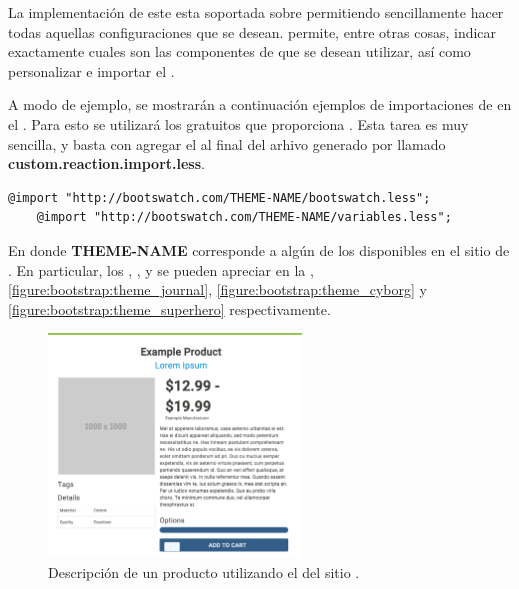 La implementación de este \packagesAS esta soportada sobre \bootstrapPackage permitiendo sencillamente hacer todas aquellas configuraciones que se desean. \bootstrapPackage permite, entre otras cosas, indicar exactamente cuales son las componentes de \bootstrapNAME que se desean utilizar, así como personalizar e importar el \themeCPT.

A modo de ejemplo, se mostrarán a continuación ejemplos de importaciones de \themesCPT en el \frameworkPC. Para esto se utilizará los \themesCPT gratuitos que proporciona \bootswatchNAME. Esta tarea es muy sencilla, y basta con agregar el  al final del arhivo generado por \bootstrapPackage llamado \textbf{custom.reaction.import.less}.

%
\medskip
\begin{lstlisting}[caption= Código genérico para importar \themesCPT desde \bootswatchNAME, label=source:less:generic_bootswatch_theme]
	@import "http://bootswatch.com/THEME-NAME/bootswatch.less";
	@import "http://bootswatch.com/THEME-NAME/variables.less";
\end{lstlisting}

En donde \textbf{THEME-NAME} corresponde a algún \themeCPT de los disponibles en el sitio de \bootswatchNAME. En particular, los \themesCPT \textbf{\themeSandstone}, \textbf{\themeJournal}, \textbf{\themeCyborg} y \textbf{\themeSuperHero} se pueden apreciar en la , \ref{figure:bootstrap:theme_journal}, \ref{figure:bootstrap:theme_cyborg} y \ref{figure:bootstrap:theme_superhero} respectivamente.


\begin{figure}[H]
	\centering
	\includegraphics[width=0.6\textwidth]{figuras/bootstrap/bootstrap_theme_sandstone.png}

	\caption{Descripción de un producto utilizando el \themeCPT \textbf{\themeSandstone} del sitio \bootswatchNAME.}
	\label{figure:bootstrap:theme_standstone}
\end{figure}

